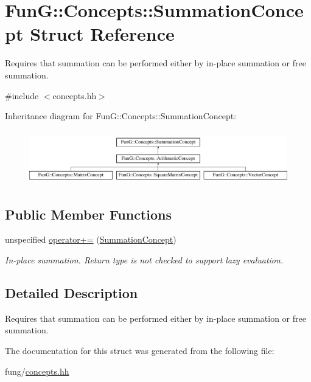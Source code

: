\hypertarget{structFunG_1_1Concepts_1_1SummationConcept}{\section{Fun\-G\-:\-:Concepts\-:\-:Summation\-Concept Struct Reference}
\label{structFunG_1_1Concepts_1_1SummationConcept}
}


Requires that summation can be performed either by in-\/place summation or free summation.  




{\ttfamily \#include $<$concepts.\-hh$>$}

Inheritance diagram for Fun\-G\-:\-:Concepts\-:\-:Summation\-Concept\-:\begin{figure}[H]
\begin{center}
\leavevmode
\includegraphics[height=2.352941cm]{structFunG_1_1Concepts_1_1SummationConcept}
\end{center}
\end{figure}
\subsection*{Public Member Functions}
\begin{DoxyCompactItemize}
\item 
\hypertarget{structFunG_1_1Concepts_1_1SummationConcept_aa8214ca88fddf74e3bc9e7dbfe2b606f}{unspecified \hyperlink{structFunG_1_1Concepts_1_1SummationConcept_aa8214ca88fddf74e3bc9e7dbfe2b606f}{operator+=} (\hyperlink{structFunG_1_1Concepts_1_1SummationConcept}{Summation\-Concept})}\label{structFunG_1_1Concepts_1_1SummationConcept_aa8214ca88fddf74e3bc9e7dbfe2b606f}

\begin{DoxyCompactList}\small\item\em In-\/place summation. Return type is not checked to support lazy evaluation. \end{DoxyCompactList}\end{DoxyCompactItemize}


\subsection{Detailed Description}
Requires that summation can be performed either by in-\/place summation or free summation. 

The documentation for this struct was generated from the following file\-:\begin{DoxyCompactItemize}
\item 
fung/\hyperlink{concepts_8hh}{concepts.\-hh}\end{DoxyCompactItemize}
